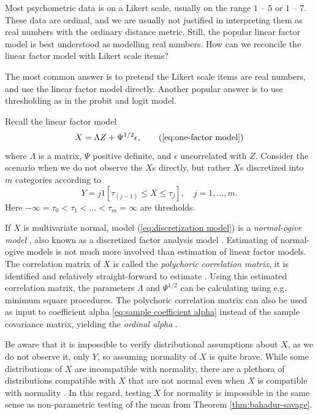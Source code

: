 Most psychometric data is on a Likert scale, usually on the range $1$ -- $5$ or $1$ -- $7$. These data are ordinal, and we are usually not justified in interpreting them as real numbers with the ordinary distance metric. Still, the popular linear factor model is best understood as modelling real numbers. How can we reconcile the linear factor model with Likert scale items?

The most common answer is to pretend the Likert scale items are real numbers, and use the linear factor model directly. Another popular answer is to use thresholding as in the probit and logit model.  

Recall the linear factor model
\begin{equation}
X=\Lambda Z+\Psi^{1/2}\epsilon,      \tag{\ref{eq:one-factor model}}
\end{equation}
where $\Lambda$ is a matrix, $\Psi$ positive definite, and $\epsilon$ uncorrelated with $Z$. Consider the scenario when we do not observe the $X$s directly, but rather $X$s discretized into $m$ categories according to
\begin{equation}
Y=j1[\tau_{(j-1)}\leq X\leq\tau_{j}],\quad j = 1, \ldots,m. \label{eq:discretization model}
\end{equation}
Here $-\infty=\tau_{0}<\tau_{1}<\ldots<\tau_{m}=\infty$
are thresholds.

If $X$ is multivariate normal, model (\ref{eq:discretization model})
is a \textit{normal-ogive model} \parencite{Swaminathan2016-rg}, also known as a discretized factor analysis model \parencite{Takane1987-pq}. Estimating of normal-ogive models is not much more involved than estimation of linear factor models. The correlation matrix of $X$ is called the \textit{polychoric correlation matrix}, it is identified and relatively straight-forward to estimate \parencite{Olsson1979-ti}. Using this estimated correlation matrix, the parameters $\Lambda$ and $\Psi^{1/2}$ can be calculating using e.g. minimum square procedures. The polychoric correlation matrix can also be used as input to coefficient alpha \eqref{eq:sample coefficient alpha} instead of the sample covariance matrix, yielding the \textit{ordinal alpha} \parencite{Zumbo2007-ap}. 

Be aware that it is impossible to verify distributional assumptions about $X$, as we do not observe it, only $Y$, so assuming normality of $X$ is quite brave. While some distributions of $X$ are incompatible with normality, there are a plethora of distributions compatible with $X$ that are not normal even when $X$ is compatible with normality \parencite{Foldnes2020-ma}. In this regard, testing $X$ for normality is impossible in the same sense as non-parametric testing of the mean from Theorem \ref{thm:bahadur-savage}.